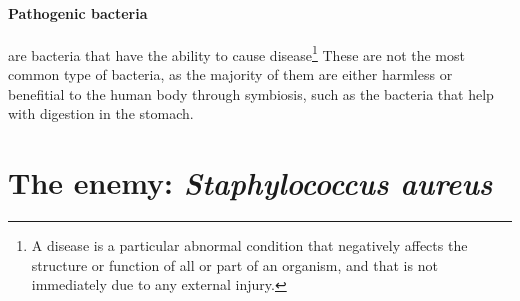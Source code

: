 \paragraph{Pathogenic bacteria} are bacteria that have the ability to cause disease\footnote{A disease is a particular abnormal condition that negatively affects the structure or function of all or part of an organism, and that is not immediately due to any external injury\cite{DorlandsMedicalDictionary2010}.} These are not the most common type of bacteria, as the majority of them are either harmless or benefitial to the human body through symbiosis, such as the bacteria that help with digestion in the stomach\cite{murrayMicrobiologiaMedica2013}.
\section{The enemy: \emph{Staphylococcus aureus}}
